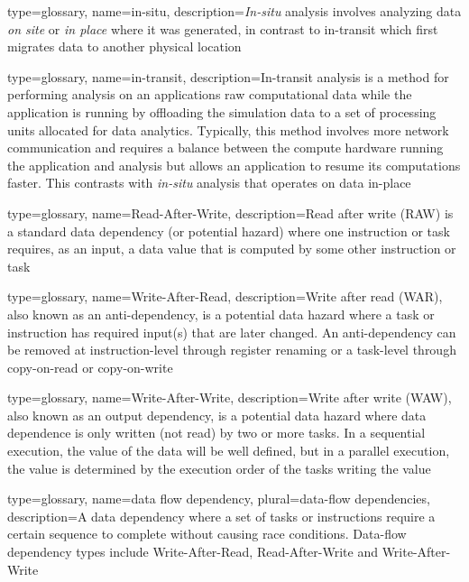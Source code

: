 {
  type=glossary,
  name={in-situ},
  description={\textit{In-situ} analysis involves analyzing data \emph{on site} or \emph{in place} where it was generated, in contrast to \gls{in-transit} which first migrates data to another physical location}
}

{
  type=glossary,
  name={in-transit},
  description={In-transit analysis is a method for performing analysis on an applications raw computational data while the application is running by offloading the simulation data to a set of processing units allocated for data analytics. Typically, this method involves more network communication and requires a balance between the compute hardware running the application and analysis but allows an application to resume its computations faster. This contrasts with \textit{\gls{in-situ}} analysis that operates on data in-place}
}

{
  type=glossary,
  name={Read-After-Write},
  description={Read after write (\gls{RAW}) is a standard data dependency (or potential hazard) where one instruction or task requires, as an input, a data value that is computed by some other instruction or task}
}

{
  type=glossary,
  name={Write-After-Read},
  description={Write after read (\gls{WAR}), also known as an anti-dependency, is a potential data hazard where a task or instruction has required input(s) that are later changed. An anti-dependency can be removed at instruction-level through register renaming or a task-level through copy-on-read or copy-on-write}
}

{
  type=glossary,
  name={Write-After-Write},
  description={Write after write (\gls{WAW}), also known as an output
  dependency, is a potential data hazard where data dependence is only
  written (not read) by two or more tasks. In a sequential execution, the value
  of the data will be well defined, but in a parallel execution, the
  value is determined by the execution order of the tasks writing the
  value}
}

{
  type=glossary,
  name={data flow dependency},
  plural={data-flow dependencies},
  description={A data dependency where a set of tasks or instructions require a certain sequence to complete without causing race conditions. Data-flow dependency types include \gls{Write-After-Read}, \gls{Read-After-Write} and \gls{Write-After-Write}}
}

